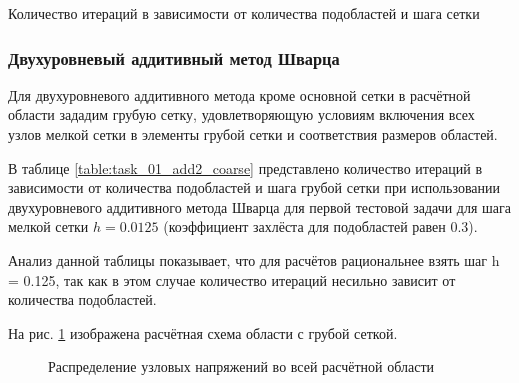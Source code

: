 \documentclass[a4paper]{article}
\begin{document}
\begin{table}[h]
\caption{Количество итераций в зависимости от количества подобластей и шага сетки}
\label{table:task_01_add_iters}
\end{table}

\newpage

\subsubsection{Двухуровневый аддитивный метод Шварца}
Для двухуровневого аддитивного метода кроме основной сетки в расчётной области зададим грубую сетку, удовлетворяющую условиям включения всех узлов мелкой сетки в элементы грубой сетки и соответствия размеров областей. 

В таблице \ref{table:task_01_add2_coarse} представлено количество итераций в зависимости от количества подобластей и шага грубой сетки при использовании двухуровневого аддитивного метода Шварца для первой тестовой задачи для шага мелкой сетки $h = 0.0125$ (коэффициент захлёста для подобластей равен 0.3).

Анализ данной таблицы показывает, что для расчётов рациональнее взять шаг h = 0.125, так как в этом случае количество итераций несильно зависит от количества подобластей.

На рис. \ref{fig:task_01_area_coarse} изображена расчётная схема области с грубой сеткой.

\begin{figure}[h]
\caption{Распределение узловых напряжений во всей расчётной области}
\label{fig:task_01_area_coarse}
\end{figure}
\end{document}
